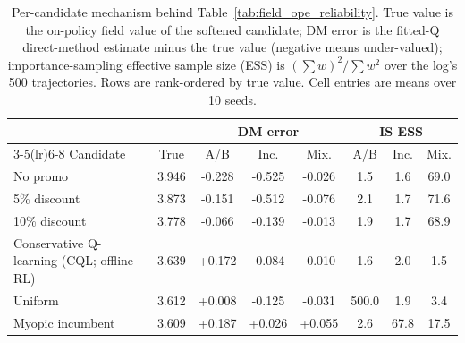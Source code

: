 \begin{table}[t]
\centering
\footnotesize
\caption{Per-candidate mechanism behind Table~\ref{tab:field_ope_reliability}. True value is the on-policy field value of the softened candidate; DM error is the fitted-Q direct-method estimate minus the true value (negative means under-valued); importance-sampling effective sample size (ESS) is $(\sum w)^2/\sum w^2$ over the log's 500 trajectories. Rows are rank-ordered by true value. Cell entries are means over 10 seeds.}
\label{tab:field_ope_candidates}
\begin{tabular}{lccccccc}
\toprule
 & & \multicolumn{3}{c}{DM error} & \multicolumn{3}{c}{IS ESS} \\
\cmidrule(lr){3-5}\cmidrule(lr){6-8}
Candidate & True & A/B & Inc. & Mix. & A/B & Inc. & Mix. \\
\midrule
No promo & 3.946 & -0.228 & -0.525 & -0.026 & 1.5 & 1.6 & 69.0 \\
5\% discount & 3.873 & -0.151 & -0.512 & -0.076 & 2.1 & 1.7 & 71.6 \\
10\% discount & 3.778 & -0.066 & -0.139 & -0.013 & 1.9 & 1.7 & 68.9 \\
Conservative Q-learning (CQL; offline RL) & 3.639 & +0.172 & -0.084 & -0.010 & 1.6 & 2.0 & 1.5 \\
Uniform & 3.612 & +0.008 & -0.125 & -0.031 & 500.0 & 1.9 & 3.4 \\
Myopic incumbent & 3.609 & +0.187 & +0.026 & +0.055 & 2.6 & 67.8 & 17.5 \\
\bottomrule
\end{tabular}
\end{table}
